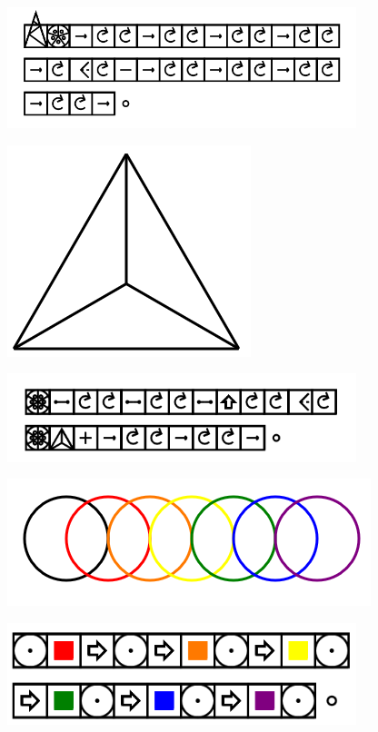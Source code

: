 \documentclass[11pt]{article}
\begin{document}
\includegraphics[width=4in]{image17.png}







\includegraphics{image18.png}

\includegraphics[width=4in]{image19.png}







\includegraphics{image20.png}

\includegraphics[width=4in]{image21.png}
\end{document}

